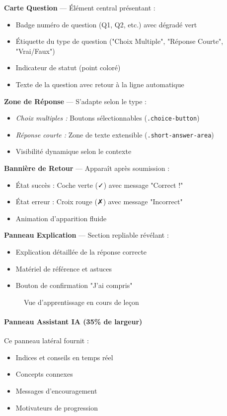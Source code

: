 \documentclass[12pt, a4paper]{report}
\begin{document}
\textbf{Carte Question} --- Élément central présentant :
\begin{itemize}
    \item Badge numéro de question (Q1, Q2, etc.) avec dégradé vert
    \item Étiquette du type de question ("Choix Multiple", "Réponse Courte", "Vrai/Faux")
    \item Indicateur de statut (point coloré)
    \item Texte de la question avec retour à la ligne automatique
\end{itemize}

\textbf{Zone de Réponse} --- S'adapte selon le type :
\begin{itemize}
    \item \textit{Choix multiples :} Boutons sélectionnables (\texttt{.choice-button})
    \item \textit{Réponse courte :} Zone de texte extensible (\texttt{.short-answer-area})
    \item Visibilité dynamique selon le contexte
\end{itemize}

\textbf{Bannière de Retour} --- Apparaît après soumission :
\begin{itemize}
    \item État succès : Coche verte (✓) avec message "Correct !"
    \item État erreur : Croix rouge (✗) avec message "Incorrect"
    \item Animation d'apparition fluide
\end{itemize}

\textbf{Panneau Explication} --- Section repliable révélant :
\begin{itemize}
    \item Explication détaillée de la réponse correcte
    \item Matériel de référence et astuces
    \item Bouton de confirmation "J'ai compris"
\end{itemize}

\begin{figure}[H]
    \centering
    \caption{Vue d'apprentissage en cours de leçon}
    \label{fig:lesson}
\end{figure}

\paragraph{Panneau Assistant IA (35\% de largeur)}
Ce panneau latéral fournit :
\begin{itemize}
    \item Indices et conseils en temps réel
    \item Concepts connexes
    \item Messages d'encouragement
    \item Motivateurs de progression
\end{itemize}
\end{document}
